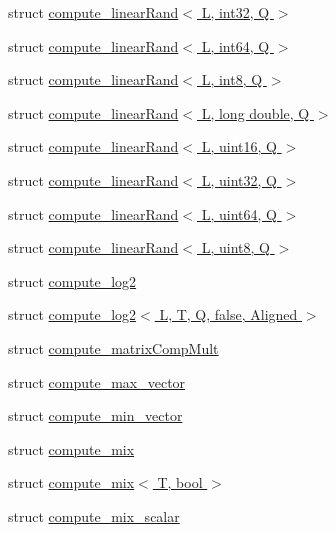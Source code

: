 \begin{DoxyCompactItemize}
\item 
struct \hyperlink{structglm_1_1detail_1_1compute__linear_rand_3_01_l_00_01int32_00_01_q_01_4}{compute\+\_\+linear\+Rand$<$ L, int32, Q $>$}
\item 
struct \hyperlink{structglm_1_1detail_1_1compute__linear_rand_3_01_l_00_01int64_00_01_q_01_4}{compute\+\_\+linear\+Rand$<$ L, int64, Q $>$}
\item 
struct \hyperlink{structglm_1_1detail_1_1compute__linear_rand_3_01_l_00_01int8_00_01_q_01_4}{compute\+\_\+linear\+Rand$<$ L, int8, Q $>$}
\item 
struct \hyperlink{structglm_1_1detail_1_1compute__linear_rand_3_01_l_00_01long_01double_00_01_q_01_4}{compute\+\_\+linear\+Rand$<$ L, long double, Q $>$}
\item 
struct \hyperlink{structglm_1_1detail_1_1compute__linear_rand_3_01_l_00_01uint16_00_01_q_01_4}{compute\+\_\+linear\+Rand$<$ L, uint16, Q $>$}
\item 
struct \hyperlink{structglm_1_1detail_1_1compute__linear_rand_3_01_l_00_01uint32_00_01_q_01_4}{compute\+\_\+linear\+Rand$<$ L, uint32, Q $>$}
\item 
struct \hyperlink{structglm_1_1detail_1_1compute__linear_rand_3_01_l_00_01uint64_00_01_q_01_4}{compute\+\_\+linear\+Rand$<$ L, uint64, Q $>$}
\item 
struct \hyperlink{structglm_1_1detail_1_1compute__linear_rand_3_01_l_00_01uint8_00_01_q_01_4}{compute\+\_\+linear\+Rand$<$ L, uint8, Q $>$}
\item 
struct \hyperlink{structglm_1_1detail_1_1compute__log2}{compute\+\_\+log2}
\item 
struct \hyperlink{structglm_1_1detail_1_1compute__log2_3_01_l_00_01_t_00_01_q_00_01false_00_01_aligned_01_4}{compute\+\_\+log2$<$ L, T, Q, false, Aligned $>$}
\item 
struct \hyperlink{structglm_1_1detail_1_1compute__matrix_comp_mult}{compute\+\_\+matrix\+Comp\+Mult}
\item 
struct \hyperlink{structglm_1_1detail_1_1compute__max__vector}{compute\+\_\+max\+\_\+vector}
\item 
struct \hyperlink{structglm_1_1detail_1_1compute__min__vector}{compute\+\_\+min\+\_\+vector}
\item 
struct \hyperlink{structglm_1_1detail_1_1compute__mix}{compute\+\_\+mix}
\item 
struct \hyperlink{structglm_1_1detail_1_1compute__mix_3_01_t_00_01bool_01_4}{compute\+\_\+mix$<$ T, bool $>$}
\item 
struct \hyperlink{structglm_1_1detail_1_1compute__mix__scalar}{compute\+\_\+mix\+\_\+scalar}

\end{DoxyCompactItemize}
